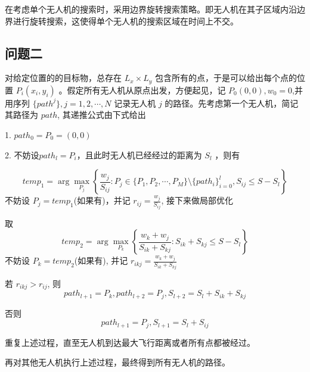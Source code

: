 \documentclass[bwprint]{gmcmthesis}
\numberwithin{figure}{section}
\begin{document}
在考虑单个无人机的搜索时，采用边界旋转搜索策略。即无人机在其子区域内沿边界进行旋转搜索，这使得单个无人机的搜索区域在时间上不交。


\subsection{问题二}
对给定位置的的目标物，总存在 $L_x\times L_y$ 包含所有的点，于是可以给出每个点的位置 $P_i(x_i,y_i)$ 。假定所有无人机从原点出发，方便起见，记 $P_0(0,0),w_0 = 0$,并用序列 $\{path^j\},j=1,2,\cdots ,N$ 记录无人机 $j$ 的路径。先考虑第一个无人机，简记其路径为 $path$, 其递推公式由下式给出

1.  $path_0 = P_0= (0,0)$

2. 不妨设$path_l = P_i$，且此时无人机已经经过的距离为 $S_l$ ，则有

$$
temp_1 = \arg\max_{P_j}\left\{ \frac{w_j}{S_{ij}} :P_j\in \{P_1,P_2,\cdots,P_M\}\setminus \{path_i\}_{i=0}^{l},S_{ij}\leq S-S_l\right\}
$$
不妨设 $P_j = temp_1$(如果有)，并记 $r_{ij} = \frac{w_j}{S_{ij}}$, 接下来做局部优化


取 
$$
temp_2 = \arg\max_{P_k}\left\{ \frac{w_k + w_j}{S_{ik} + S_{kj}} : S_{ik} + S_{kj} \leq S-S_l\right\}
$$
不妨设 $P_k = temp_2$(如果有), 并记 $r_{ikj} = \frac{w_k + w_j}{S_{ik} + S_{kj}}$

若 $r_{ikj} > r_{ij}$, 则 
$$
path_{l+1} = P_k,path_{l+2}=P_j,S_{l+2}=S_l+S_{ik}+S_{kj}
$$

否则 
$$
path_{l+1} = P_j,S_{l+1} = S_l + S_{ij}
$$

重复上述过程，直至无人机到达最大飞行距离或者所有点都被经过。

再对其他无人机执行上述过程，最终得到所有无人机的路径。
\end{document}
